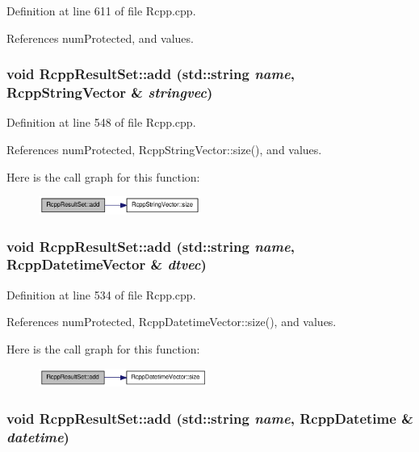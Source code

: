 Definition at line 611 of file Rcpp.cpp.

References numProtected, and values.\hypertarget{classRcppResultSet_a10d01a24ef006c1ff14ca7e95fb9e0ea}{
\subsubsection[{add}]{\setlength{\rightskip}{0pt plus 5cm}void RcppResultSet::add (std::string {\em name}, \/  {\bf RcppStringVector} \& {\em stringvec})}}
\label{classRcppResultSet_a10d01a24ef006c1ff14ca7e95fb9e0ea}


Definition at line 548 of file Rcpp.cpp.

References numProtected, RcppStringVector::size(), and values.

Here is the call graph for this function:\nopagebreak
\begin{figure}[H]
\begin{center}
\leavevmode
\includegraphics[width=150pt]{classRcppResultSet_a10d01a24ef006c1ff14ca7e95fb9e0ea_cgraph}
\end{center}
\end{figure}
\hypertarget{classRcppResultSet_aac8cade970247a377e8dbebf1c79a86c}{
\subsubsection[{add}]{\setlength{\rightskip}{0pt plus 5cm}void RcppResultSet::add (std::string {\em name}, \/  {\bf RcppDatetimeVector} \& {\em dtvec})}}
\label{classRcppResultSet_aac8cade970247a377e8dbebf1c79a86c}


Definition at line 534 of file Rcpp.cpp.

References numProtected, RcppDatetimeVector::size(), and values.

Here is the call graph for this function:\nopagebreak
\begin{figure}[H]
\begin{center}
\leavevmode
\includegraphics[width=157pt]{classRcppResultSet_aac8cade970247a377e8dbebf1c79a86c_cgraph}
\end{center}
\end{figure}
\hypertarget{classRcppResultSet_a1d921e7a24e50369ae67a1bc63826131}{
\subsubsection[{add}]{\setlength{\rightskip}{0pt plus 5cm}void RcppResultSet::add (std::string {\em name}, \/  {\bf RcppDatetime} \& {\em datetime})}}
\label{classRcppResultSet_a1d921e7a24e50369ae67a1bc63826131}


